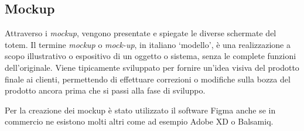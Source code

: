 

\subsection{Mockup}
Attraverso i \textit{mockup}, vengono presentate e spiegate le diverse schermate del totem.
Il termine \textit{mockup} o \textit{mock-up}, in italiano \enquote*{modello}, è una realizzazione a scopo illustrativo o espositivo di un oggetto o sistema, senza le complete funzioni dell'originale. Viene tipicamente sviluppato per fornire un'idea visiva del prodotto finale ai clienti, permettendo di effettuare correzioni o modifiche sulla bozza del prodotto ancora prima che si passi alla fase di sviluppo.

Per la creazione dei mockup è stato utilizzato il software Figma anche se in commercio ne esistono molti altri come ad esempio Adobe XD o Balsamiq.

